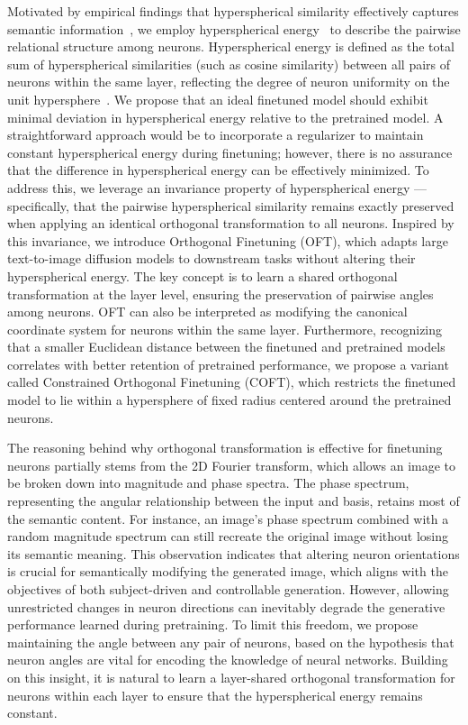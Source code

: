 Motivated by empirical findings that hyperspherical similarity effectively captures semantic information~\cite{liu2017deep,liu2018decoupled,chen2020angular}, we employ hyperspherical energy~\cite{liu2018learning} to describe the pairwise relational structure among neurons. Hyperspherical energy is defined as the total sum of hyperspherical similarities (such as cosine similarity) between all pairs of neurons within the same layer, reflecting the degree of neuron uniformity on the unit hypersphere~\cite{liu2021learning}. We propose that an ideal finetuned model should exhibit minimal deviation in hyperspherical energy relative to the pretrained model. A straightforward approach would be to incorporate a regularizer to maintain constant hyperspherical energy during finetuning; however, there is no assurance that the difference in hyperspherical energy can be effectively minimized. To address this, we leverage an invariance property of hyperspherical energy — specifically, that the pairwise hyperspherical similarity remains exactly preserved when applying an identical orthogonal transformation to all neurons. Inspired by this invariance, we introduce Orthogonal Finetuning (OFT), which adapts large text-to-image diffusion models to downstream tasks without altering their hyperspherical energy. The key concept is to learn a shared orthogonal transformation at the layer level, ensuring the preservation of pairwise angles among neurons. OFT can also be interpreted as modifying the canonical coordinate system for neurons within the same layer. Furthermore, recognizing that a smaller Euclidean distance between the finetuned and pretrained models correlates with better retention of pretrained performance, we propose a variant called Constrained Orthogonal Finetuning (COFT), which restricts the finetuned model to lie within a hypersphere of fixed radius centered around the pretrained neurons.

The reasoning behind why orthogonal transformation is effective for finetuning neurons partially stems from the 2D Fourier transform, which allows an image to be broken down into magnitude and phase spectra. The phase spectrum, representing the angular relationship between the input and basis, retains most of the semantic content. For instance, an image’s phase spectrum combined with a random magnitude spectrum can still recreate the original image without losing its semantic meaning. This observation indicates that altering neuron orientations is crucial for semantically modifying the generated image, which aligns with the objectives of both subject-driven and controllable generation. However, allowing unrestricted changes in neuron directions can inevitably degrade the generative performance learned during pretraining. To limit this freedom, we propose maintaining the angle between any pair of neurons, based on the hypothesis that neuron angles are vital for encoding the knowledge of neural networks. Building on this insight, it is natural to learn a layer-shared orthogonal transformation for neurons within each layer to ensure that the hyperspherical energy remains constant.

